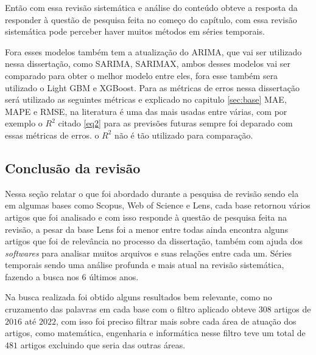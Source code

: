 Então com essa revisão sistemática e análise do conteúdo obteve a resposta da responder à questão de pesquisa feita no começo do capítulo, com essa revisão sistemática pode perceber haver muitos métodos em séries temporais.

Fora esses modelos também tem a atualização do ARIMA, que vai ser utilizado nessa dissertação, como SARIMA, SARIMAX, ambos desses modelos vai ser comparado para obter o melhor modelo entre eles, fora esse também sera utilizado o Light GBM e XGBoost. Para as métricas de erros nessa dissertação será utilizado as seguintes métricas e explicado no capitulo \ref{sec:base} MAE, MAPE e RMSE, na literatura é uma das mais usadas entre várias, com por exemplo o $R^2$ citado \eqref{eq2} para as previsões futuras sempre foi deparado com essas métricas de erros. o $R^2$ não é tão utilizado para comparação.

\subsection{Conclus\~ao da revis\~ao} \label{subsec:conclusão da revisão}

Nessa seção relatar o que foi abordado durante a pesquisa de revisão sendo ela em algumas bases como Scopus, Web of Science e Lens, cada base retornou vários artigos que foi analisado e com isso responde à questão de pesquisa feita na revisão, a pesar da base Lens foi a menor entre todas ainda encontra alguns artigos que foi de relevância no processo da dissertação, também com ajuda dos \textit{softwares} para analisar muitos arquivos e suas relações entre cada um. Séries temporais sendo uma análise profunda e mais atual na revisão sistemática, fazendo a busca nos 6 últimos anos.

Na busca realizada foi obtido alguns resultados bem relevante, como no cruzamento das palavras em cada base com o filtro aplicado obteve $ 308 $ artigos de $ 2016 $ até $ 2022 $, com isso foi preciso filtrar mais sobre cada área de atuação dos artigos, como matemática, engenharia e informática nesse filtro teve um total de $ 481 $ artigos excluindo que seria das outras áreas.




